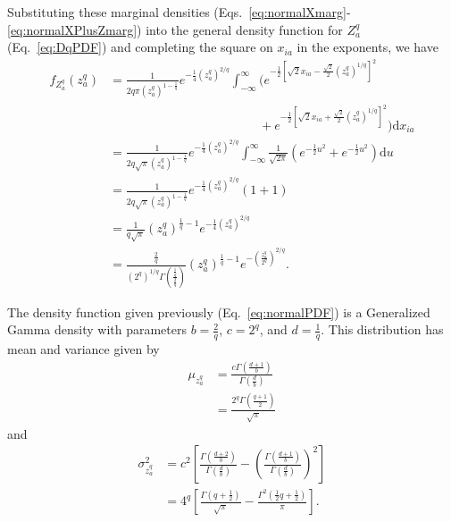 \documentclass[aoas]{imsart}
\begin{document}
Substituting these marginal densities (Eqs.~\ref{eq:normalXmarg}-\ref{eq:normalXPlusZmarg}) into the general density function for $Z^q_a$ (Eq.~\ref{eq:DqPDF}) and completing the square on $x_{ia}$ in the exponents, we have
%
\begin{equation}\label{eq:normalPDF}
\begin{aligned}
f_{Z^q_a}(z^q_a) &= \frac{1}{2 q \pi \left(z^q_a\right)^{1 - \frac{1}{q}}} e^{-\frac{1}{4}\left(z^q_a\right)^{2    /q}}\int_{-\infty}^{\infty} \biggl(e^{-\frac{1}{2}\left[\sqrt{2}x_{ia} - \frac{\sqrt{2}}{2}\left(z^q_a\right)^{1/q}\right]^2} \\
&\hspace{2in} + e^{-\frac{1}{2}\left[\sqrt{2}x_{ia} + \frac{\sqrt{2}}{2}\left(z^q_a\right)^{1/q}\right]^2}\biggr) \text{d}x_{ia} \\
&= \frac{1}{2 q \sqrt{\pi} \left(z^q_a\right)^{1 - \frac{1}{q}}} e^{-\frac{1}{4}\left(z^q_a\right)^{2/q}} \int_{-\infty}^{\infty}\frac{1}{\sqrt{2\pi}} \left(e^{-\frac{1}{2}u^2} + e^{-\frac{1}{2}u^2}\right) \text{d}u \\
&= \frac{1}{2 q \sqrt{\pi} \left(z^q_a\right)^{1 - \frac{1}{q}}} e^{-\frac{1}{4}\left(z^q_a\right)^{2/q}} (1 + 1) \\
&= \frac{1}{q \sqrt{\pi}}\left(z^q_a\right)^{\frac{1}{q} - 1} e^{-\frac{1}{4}\left(z^q_a\right)^{2/q}} \\
&= \frac{\frac{2}{q}}{\left(2^q\right)^{1/q} \Gamma\left(\frac{\frac{1}{q}}{\frac{2}{q}}\right)}\left(z^q_a\right)^{\frac{1}{q} - 1} e^{-\left(\frac{z^q_a}{2^q}\right)^{2/q}}.
\end{aligned}
\end{equation}

The density function given previously (Eq.~\ref{eq:normalPDF}) is a Generalized Gamma density with parameters $b = \frac{2}{q}$, $c = 2^q$, and $d = \frac{1}{q}$. This distribution has mean and variance given by
%
\begin{equation}\label{eq:1DnormalDqMean}
\begin{aligned}
\mu_{z^q_a} &= \frac{c\Gamma\left(\frac{d+1}{b}\right)}{\Gamma\left(\frac{d}{b}\right)} \\
&= \frac{2^q \Gamma\left(\frac{q + 1}{2}\right)}{\sqrt{\pi}}
\end{aligned}
\end{equation}
%
and
%
\begin{equation}\label{eq:1DnormalDqVar}
\begin{aligned}
\sigma^2_{z^q_a} &= c^2\left[\frac{\Gamma\left(\frac{d+2}{b}\right)}{\Gamma\left(\frac{d}{b}\right)} - \left(\frac{\Gamma\left(\frac{d+1}{b}\right)}{\Gamma\left(\frac{d}{b}\right)}\right)^2\right] \\
&= 4^{q}\left[\frac{\Gamma\left(q + \frac{1}{2}\right)}{\sqrt{\pi}} - \frac{\Gamma^2\left(\frac{1}{2}q + \frac{1}{2}\right)}{\pi}\right].
\end{aligned}
\end{equation}
\end{document}
